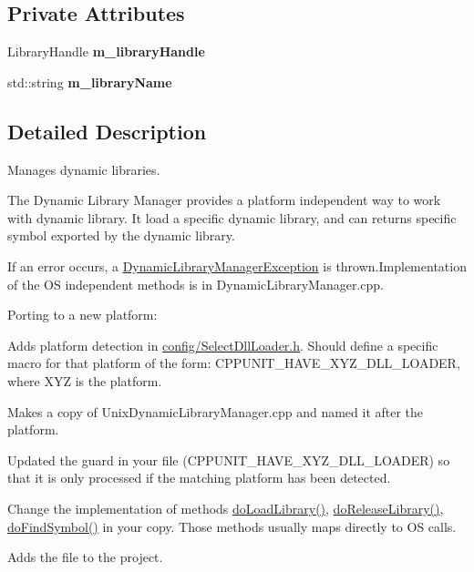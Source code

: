 \subsection*{Private Attributes}
\begin{DoxyCompactItemize}
\item 
Library\+Handle {\bfseries m\+\_\+library\+Handle}\hypertarget{class_dynamic_library_manager_a88a0a3c97a944bdd331e345ff44bb131}{}\label{class_dynamic_library_manager_a88a0a3c97a944bdd331e345ff44bb131}

\item 
std\+::string {\bfseries m\+\_\+library\+Name}\hypertarget{class_dynamic_library_manager_a413e6530f3de6564d195082d0a5a52d8}{}\label{class_dynamic_library_manager_a413e6530f3de6564d195082d0a5a52d8}

\end{DoxyCompactItemize}


\subsection{Detailed Description}
Manages dynamic libraries. 

The Dynamic Library Manager provides a platform independent way to work with dynamic library. It load a specific dynamic library, and can returns specific symbol exported by the dynamic library.

If an error occurs, a \hyperlink{class_dynamic_library_manager_exception}{Dynamic\+Library\+Manager\+Exception} is thrown.Implementation of the OS independent methods is in Dynamic\+Library\+Manager.\+cpp.

Porting to a new platform\+:
\begin{DoxyItemize}
\item Adds platform detection in \hyperlink{_select_dll_loader_8h}{config/\+Select\+Dll\+Loader.\+h}. Should define a specific macro for that platform of the form\+: C\+P\+P\+U\+N\+I\+T\+\_\+\+H\+A\+V\+E\+\_\+\+X\+Y\+Z\+\_\+\+D\+L\+L\+\_\+\+L\+O\+A\+D\+ER, where X\+YZ is the platform.
\item Makes a copy of Unix\+Dynamic\+Library\+Manager.\+cpp and named it after the platform.
\item Updated the \textquotesingle{}guard\textquotesingle{} in your file (C\+P\+P\+U\+N\+I\+T\+\_\+\+H\+A\+V\+E\+\_\+\+X\+Y\+Z\+\_\+\+D\+L\+L\+\_\+\+L\+O\+A\+D\+ER) so that it is only processed if the matching platform has been detected.
\item Change the implementation of methods \hyperlink{class_dynamic_library_manager_adf9585fc8f3284df5471d1c5e04a105d}{do\+Load\+Library()}, \hyperlink{class_dynamic_library_manager_a99b554dad3fe8b84de3e8b443d5a7ca0}{do\+Release\+Library()}, \hyperlink{class_dynamic_library_manager_ac3079091cf970cc285216a27e13cff44}{do\+Find\+Symbol()} in your copy. Those methods usually maps directly to OS calls.
\item Adds the file to the project. 
\end{DoxyItemize}

